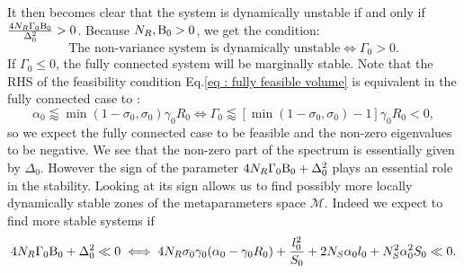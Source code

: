 \documentclass[12pt, titlepage]{report}
\begin{document}
	It then becomes clear that the system is dynamically unstable if and only if $\frac{4N_R\Gamma_0 \text{B}_0}{\Delta_0^2} > 0 $. Because $N_R, \text{B}_0 > 0$, we get the condition:
	\begin{equation}
	\boxed{
	\text{The non-variance system is dynamically unstable} \iff \Gamma_0 > 0.
	}
	\end{equation}
	If $\Gamma_0 \leq 0$, the fully connected system will be marginally stable.
	Note that the RHS of the feasibility condition Eq.\eqref{eq : fully feasible volume} is equivalent in the fully connected case to :
	\begin{equation}
	\alpha_0 \lessapprox \min(1-\sigma_0, \sigma_0)\gamma_0 R_0 \iff \Gamma_0 \lessapprox \left[\min(1-\sigma_0, \sigma_0)-1\right] \gamma_0 R_0 < 0,
	\end{equation}
	so we expect the fully connected case to be feasible and the non-zero eigenvalues to be negative.
	We see that the non-zero part of the spectrum is essentially given by $\Delta_0$. However the sign of the parameter
	$4N_R\Gamma_0\text{B}_0+\Delta_0^2$ plays an essential role in the stability. Looking at its sign allows us to find possibly more locally dynamically stable zones of the metaparameters space $\mathcal{M}$. Indeed we expect to find more stable systems if
	\begin{equation}
	4 N_R \Gamma_0 \text{B}_0 + \Delta_0 ^2 \ll 0 \iff 4N_R \sigma_0 \gamma_0  (\alpha_0 - \gamma_0 R_0) +\frac{l_0^2}{S_0}+2N_S\alpha_0  l_0 + N_S^2 \alpha_0^2 S_0 \ll 0. \label{eq : dynamical stability methods fully connected metaparameters}
	\end{equation}
\end{document}
